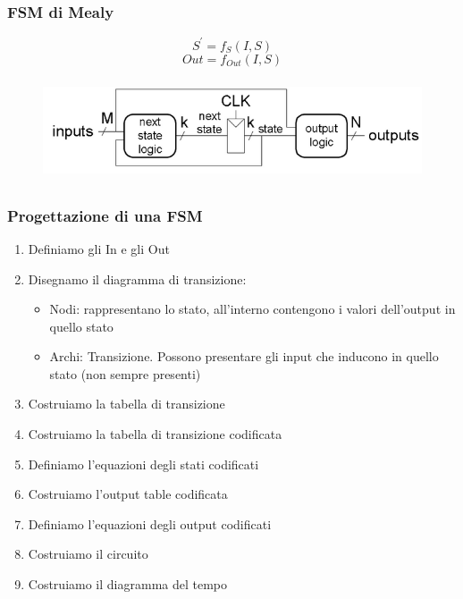 \documentclass{report}
\begin{document}
        \subsubsection{FSM di Mealy}
            $$S^{'} = f_{S}\left(I, S\right)$$
            $$Out = f_{Out}\left(I, S\right)$$
            \begin{center}
                \begin{figure}[H]
                    \includegraphics[width=\textwidth, height=3cm]{mealyfsm.png}
                \end{figure}
            \end{center}
        \subsubsection{Progettazione di una FSM}
            \begin{enumerate}
                \item Definiamo gli In e gli Out
                \item Disegnamo il diagramma di transizione:
                    \begin{itemize}
                        \item Nodi: rappresentano lo stato, all'interno contengono 
                            i valori dell'output in quello stato
                        \item Archi: Transizione. Possono presentare gli input 
                            che inducono in quello stato (non sempre presenti)
                    \end{itemize}
                \item Costruiamo la tabella di transizione
                \item Costruiamo la tabella di transizione codificata
                \item Definiamo l'equazioni degli stati codificati
                \item Costruiamo l'output table codificata
                \item Definiamo l'equazioni degli output codificati
                \item Costruiamo il circuito
                \item Costruiamo il diagramma del tempo
                \end{enumerate}
\end{document}
